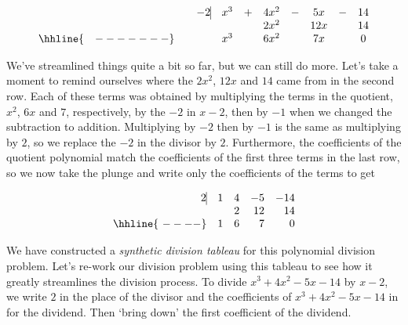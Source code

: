 \documentclass{ximera}
\begin{document}
\setlength\arraycolsep{0.1pt}
\setlength\extrarowheight{2pt}

\[ 
\begin{array}{cccccccccc}
    & & - 2   \vline&   x^3 & + & 4x^2 & - & 5x & - & 14 \\
    &  &  &   & &   2x^2 &  & 12x &  & 14 \\ \hhline{~~~-------} 
    &  &  & x^3  &  & 6 x^2 &  & 7x &  &0  \\  
\end{array}
\]

\setlength\arraycolsep{5pt}
\setlength\extrarowheight{0pt}

We've streamlined things quite a bit so far, but we can still do more.  Let's take a moment to remind ourselves where the $2x^2$, $12x$ and $14$ came from in the second row.  Each of these terms was obtained by multiplying the terms in the quotient, $x^2$, $6x$ and $7$, respectively, by the $-2$ in $x-2$,  then by $-1$ when we changed the subtraction to addition.  Multiplying by $-2$ then by $-1$ is the same as multiplying by $2$, so we replace the $-2$ in the divisor by $2$.   Furthermore, the coefficients of the quotient polynomial match the coefficients of the first three terms in the last row, so we now take the plunge and write only the coefficients of the terms to get

\[ 
\begin{array}{rrrrr}
    2   \vline& 1 & 4 & -5  & -14 \\
    &&   2 &   12 &   14 \\ \hhline{~----} 
    & 1  &   6  &  7 &  0  \\  
\end{array}
\]

We have constructed a \emph{synthetic division tableau} for this polynomial division problem.  Let's re-work our division problem using this tableau to see how it greatly streamlines the division process.  To divide $x^3+4x^2-5x-14$ by $x-2$, we write $2$ in the place of the divisor and the coefficients of $x^3+4x^2-5x-14$ in for the dividend.  Then `bring down' the first coefficient of the dividend.
\end{document}
